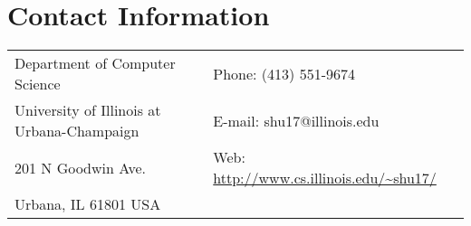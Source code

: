 \section{\sc Contact Information}
\vspace{.05in}
\begin{tabular}{@{}p{3in}p{4in}}
Department of Computer Science                  & {Phone:}  (413) 551-9674 \\
University of Illinois at Urbana-Champaign      & {E-mail:} shu17@illinois.edu\\
201 N Goodwin Ave.                              & {Web:} \url{http://www.cs.illinois.edu/~shu17/}\\
Urbana, IL 61801 USA
\end{tabular}
